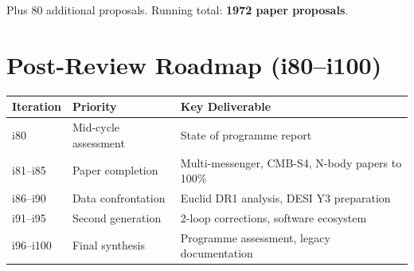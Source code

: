 \documentclass[11pt,a4paper]{article}
\begin{document}
Plus 80 additional proposals. Running total: \textbf{1972 paper proposals}.

\section{Post-Review Roadmap (i80--i100)}

\begin{center}
\begin{tabular}{lll}
\toprule
\textbf{Iteration} & \textbf{Priority} & \textbf{Key Deliverable} \\
\midrule
i80 & Mid-cycle assessment & State of programme report \\
i81--i85 & Paper completion & Multi-messenger, CMB-S4, N-body papers to 100\% \\
i86--i90 & Data confrontation & Euclid DR1 analysis, DESI Y3 preparation \\
i91--i95 & Second generation & 2-loop corrections, software ecosystem \\
i96--i100 & Final synthesis & Programme assessment, legacy documentation \\
\bottomrule
\end{tabular}
\end{center}
\end{document}
